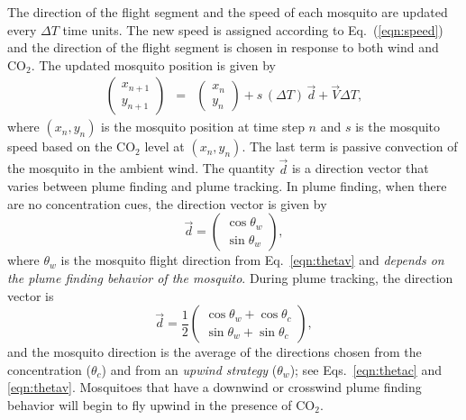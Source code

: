 \documentclass[10pt]{article}
\begin{document}
The direction of the flight segment and the speed of each mosquito are updated every $\Delta T$ time units.   The new speed is assigned according to Eq.~(\ref{eqn:speed}) and the direction of the flight segment is chosen in response to both wind and CO$_2$.
The updated mosquito position is given by
\begin{eqnarray}
	\begin{pmatrix} x_{n+1} \\ y_{n+1} \end{pmatrix} &=&
	\begin{pmatrix} x_n \\ y_n \end{pmatrix} + s\,(\Delta T) \,\vec{d} + \vec{V}\Delta T , \label{eq:wind:motion}
\end{eqnarray}
where $(x_n,y_n)$ is the mosquito position at time step $n$ and $s$ is the mosquito speed based on the CO$_2$ level at $(x_n,y_n)$. The last term is passive convection of the mosquito in the ambient wind. The quantity $\vec{d}$ is a direction vector that varies between plume finding and plume tracking. In plume finding, when there are no concentration cues, the direction vector is given by 
\begin{equation*}
	\vec{d} = \begin{pmatrix}  \cos{\theta_w}\\ \sin{\theta_w} \end{pmatrix},
\end{equation*}
where $\theta_w$ is the mosquito flight direction from Eq.~\eqref{eqn:thetav} and \textit{depends on the plume finding behavior of the mosquito}. During plume tracking, the direction vector is
\begin{equation*}
	\vec{d} = \frac{1}{2} \begin{pmatrix}  \cos{\theta_w} + \cos{\theta_c}\\ \sin{\theta_w} + \sin{\theta_c} \end{pmatrix},
\end{equation*}
and the mosquito direction is the average of the directions chosen from the concentration ($\theta_c$) and from an \textit{upwind strategy} ($\theta_w$); see Eqs.~\eqref{eqn:thetac} and \eqref{eqn:thetav}. Mosquitoes that have a downwind or crosswind plume finding behavior will begin to fly upwind in the presence of CO$_2$. 


\end{document}
